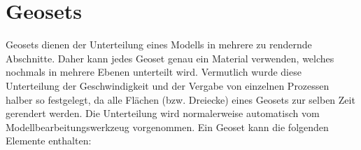 \chapter{Geosets}
Geosets dienen der Unterteilung eines Modells in mehrere zu rendernde Abschnitte. Daher kann jedes Geoset genau ein Material verwenden, welches nochmals in mehrere Ebenen unterteilt wird.
Vermutlich wurde diese Unterteilung der Geschwindigkeit und der Vergabe von einzelnen Prozessen halber so festgelegt, da
alle Flächen (bzw. Dreiecke) eines Geosets zur selben Zeit gerendert werden.
Die Unterteilung wird normalerweise automatisch vom Modellbearbeitungswerkzeug vorgenommen.
Ein Geoset kann die folgenden Elemente enthalten:
